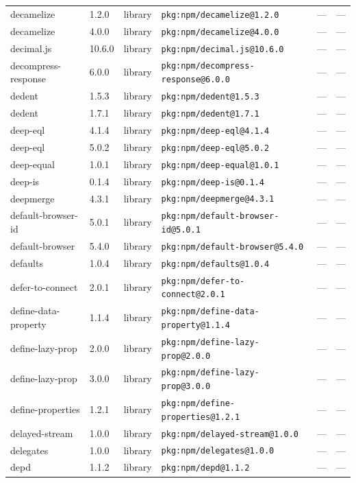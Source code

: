 \documentclass[11pt]{article}
\begin{document}
\begin{longtable}{|l|l|l|p{2.2cm}|l|p{4cm}|}
decamelize & 1.2.0 & library & \texttt{pkg:npm/decamelize@1.2.0} & — & — \\
decamelize & 4.0.0 & library & \texttt{pkg:npm/decamelize@4.0.0} & — & — \\
decimal.js & 10.6.0 & library & \texttt{pkg:npm/decimal.js@10.6.0} & — & — \\
decompress-response & 6.0.0 & library & \texttt{pkg:npm/decompress-response@6.0.0} & — & — \\
dedent & 1.5.3 & library & \texttt{pkg:npm/dedent@1.5.3} & — & — \\
dedent & 1.7.1 & library & \texttt{pkg:npm/dedent@1.7.1} & — & — \\
deep-eql & 4.1.4 & library & \texttt{pkg:npm/deep-eql@4.1.4} & — & — \\
deep-eql & 5.0.2 & library & \texttt{pkg:npm/deep-eql@5.0.2} & — & — \\
deep-equal & 1.0.1 & library & \texttt{pkg:npm/deep-equal@1.0.1} & — & — \\
deep-is & 0.1.4 & library & \texttt{pkg:npm/deep-is@0.1.4} & — & — \\
deepmerge & 4.3.1 & library & \texttt{pkg:npm/deepmerge@4.3.1} & — & — \\
default-browser-id & 5.0.1 & library & \texttt{pkg:npm/default-browser-id@5.0.1} & — & — \\
default-browser & 5.4.0 & library & \texttt{pkg:npm/default-browser@5.4.0} & — & — \\
defaults & 1.0.4 & library & \texttt{pkg:npm/defaults@1.0.4} & — & — \\
defer-to-connect & 2.0.1 & library & \texttt{pkg:npm/defer-to-connect@2.0.1} & — & — \\
define-data-property & 1.1.4 & library & \texttt{pkg:npm/define-data-property@1.1.4} & — & — \\
define-lazy-prop & 2.0.0 & library & \texttt{pkg:npm/define-lazy-prop@2.0.0} & — & — \\
define-lazy-prop & 3.0.0 & library & \texttt{pkg:npm/define-lazy-prop@3.0.0} & — & — \\
define-properties & 1.2.1 & library & \texttt{pkg:npm/define-properties@1.2.1} & — & — \\
delayed-stream & 1.0.0 & library & \texttt{pkg:npm/delayed-stream@1.0.0} & — & — \\
delegates & 1.0.0 & library & \texttt{pkg:npm/delegates@1.0.0} & — & — \\
depd & 1.1.2 & library & \texttt{pkg:npm/depd@1.1.2} & — & — \\

\end{longtable}
\end{document}
